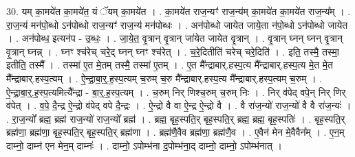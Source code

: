 \documentclass[17pt]{extarticle}
\begin{document}
30. यम् का॒मये॑त का॒मये॑त॒ यं ॅयम् का॒मये॑त । . का॒मये॑त राज॒न्यꣳ॑ राज॒न्य॑म् का॒मये॑त का॒मये॑त राज॒न्य᳚म् । . रा॒ज॒न्य॑ मन॑पो॒ब्धो ऽन॑पोब्धो राज॒न्यꣳ॑ राज॒न्य॑ मन॑पोब्धः । . अन॑पोब्धो जायेत जाये॒ता न॑पो॒ब्धो ऽन॑पोब्धो जायेत । . अन॑पोब्ध॒ इत्यन॑प - उ॒ब्धः॒ । . जा॒ये॒त॒ वृ॒त्रान् वृ॒त्रान् जा॑येत जायेत वृ॒त्रान् । . वृ॒त्रान् घ्नन् घ्नन् वृ॒त्रान् वृ॒त्रान् घ्नन्न् । . घ्नꣳ श्च॑रेच् चरे॒द् घ्नन् घ्नꣳ श्च॑रेत् । . च॒रे॒दितीति॑ चरेच् चरे॒दिति॑ । . इति॒ तस्मै॒ तस्मा॒ इतीति॒ तस्मै᳚ । . तस्मा॑ ए॒त मे॒तम् तस्मै॒ तस्मा॑ ए॒तम् । . ए॒त मै᳚न्द्राबार्.हस्प॒त्य मै᳚न्द्राबार्.हस्प॒त्य मे॒त मे॒त मै᳚न्द्राबार्.हस्प॒त्यम् । . ऐ॒न्द्रा॒बा॒र्॒.ह॒स्प॒त्यम् च॒रुम् च॒रु मै᳚न्द्राबार्.हस्प॒त्य मै᳚न्द्राबार्.हस्प॒त्यम् च॒रुम् । . ऐ॒न्द्रा॒बा॒र्॒.ह॒स्प॒त्यमित्यै᳚न्द्रा - बा॒र्॒.ह॒स्प॒त्यम् । . च॒रुम् निर् णिश्च॒रुम् च॒रुम् निः । . निर् व॑पेद् वपे॒न् निर् णिर् व॑पेत् । . व॒पे॒ दै॒न्द्र ऐ॒न्द्रो व॑पेद् वपे दै॒न्द्रः । . ऐ॒न्द्रो वै वा ऐ॒न्द्र ऐ॒न्द्रो वै । . वै रा॑ज॒न्यो॑ राज॒न्यो॑ वै वै रा॑ज॒न्यः॑ । . रा॒ज॒न्यो᳚ ब्रह्म॒ ब्रह्म॑ राज॒न्यो॑ राज॒न्यो᳚ ब्रह्म॑ । . ब्रह्म॒ बृह॒स्पति॒र् बृह॒स्पति॒र् ब्रह्म॒ ब्रह्म॒ बृह॒स्पतिः॑ । . बृह॒स्पति॒र् ब्रह्म॑णा॒ ब्रह्म॑णा॒ बृह॒स्पति॒र् बृह॒स्पति॒र् ब्रह्म॑णा । . ब्रह्म॑णै॒वैव ब्रह्म॑णा॒ ब्रह्म॑णै॒व । . ए॒वैन॑ मेन मे॒वैवैन᳚म् । . ए॒न॒म् दाम्नो॒ दाम्न॑ एन मेन॒म् दाम्नः॑ । . दाम्नो॒ ऽपोम्भ॑ना द॒पोम्भ॑ना॒द् दाम्नो॒ दाम्नो॒ ऽपोम्भ॑नात् । \newline
\end{document}
